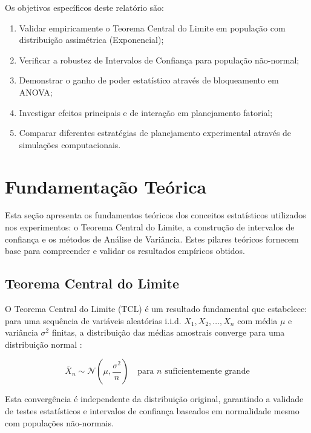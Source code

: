 \documentclass[12pt,a4paper,oneside]{article}
\begin{document}
Os objetivos específicos deste relatório são:

\begin{enumerate}
    \item Validar empiricamente o Teorema Central do Limite em população com distribuição assimétrica (Exponencial);
    \item Verificar a robustez de Intervalos de Confiança para população não-normal;
    \item Demonstrar o ganho de poder estatístico através de bloqueamento em ANOVA;
    \item Investigar efeitos principais e de interação em planejamento fatorial;
    \item Comparar diferentes estratégias de planejamento experimental através de simulações computacionais.
\end{enumerate}

\section{Fundamentação Teórica}

Esta seção apresenta os fundamentos teóricos dos conceitos estatísticos utilizados nos experimentos: o Teorema Central do Limite, a construção de intervalos de confiança e os métodos de Análise de Variância. Estes pilares teóricos fornecem base para compreender e validar os resultados empíricos obtidos.

\subsection{Teorema Central do Limite}

O Teorema Central do Limite (TCL) é um resultado fundamental que estabelece: para uma sequência de variáveis aleatórias i.i.d. $X_1, X_2, \ldots, X_n$ com média $\mu$ e variância $\sigma^2$ finitas, a distribuição das médias amostrais converge para uma distribuição normal \cite{devore2015}:

\begin{equation}
\overline{X}_n \sim \mathcal{N}\left(\mu, \frac{\sigma^2}{n}\right) \quad \text{para } n \text{ suficientemente grande}
\end{equation}

Esta convergência é independente da distribuição original, garantindo a validade de testes estatísticos e intervalos de confiança baseados em normalidade mesmo com populações não-normais.
\end{document}
